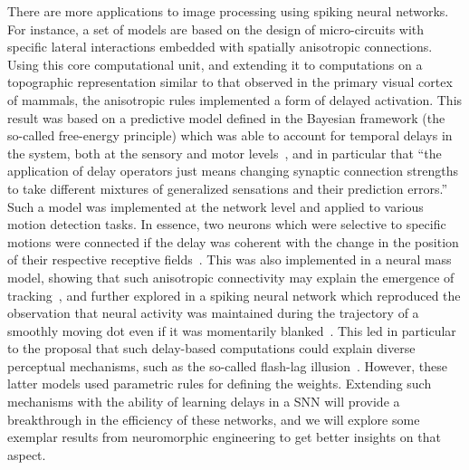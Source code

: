 \documentclass[brainsci, %
               review,submit,pdftex,moreauthors
               ]{Definitions/mdpi}
\begin{document}
There are more applications to image processing using spiking neural networks. For instance, a set of models are based on the design of micro-circuits with specific lateral interactions embedded with spatially anisotropic connections. Using this core computational unit, and extending it to computations on a topographic representation similar to that observed in the primary visual cortex of mammals, the anisotropic rules implemented a form of delayed activation. This result was based on a predictive model defined in the Bayesian framework (the so-called free-energy principle) which was able to account for temporal delays in the  system, both at the sensory and motor levels~\citep{perrinet_active_2014}, and in particular that ``the application of delay operators just means changing synaptic connection strengths to take different mixtures of generalized sensations and their prediction errors.'' Such a model was implemented at the network level and applied to various motion detection tasks. In essence, two neurons which were selective to specific motions were connected if the delay was coherent with the change in the position of their respective receptive fields~\citep{hogendoorn_predictive_2019}.  This was also implemented in a neural mass model, showing that such anisotropic connectivity may explain the emergence of tracking~\citep{khoei_motion-based_2013}, and further explored in a spiking neural network which reproduced the observation that neural activity was maintained during the trajectory of a smoothly moving dot even if it was momentarily blanked~\citep{kaplan_anisotropic_2013}. This led in particular to the proposal that such delay-based computations could explain diverse perceptual mechanisms, such as the so-called flash-lag illusion~\citep{khoei_flash-lag_2017}. However, these latter models used parametric rules for defining the weights. Extending such mechanisms with the ability of learning delays in a SNN will provide a breakthrough in the efficiency of these networks, and we will explore some exemplar results from neuromorphic engineering to get better insights on that aspect.
%
\end{document}
